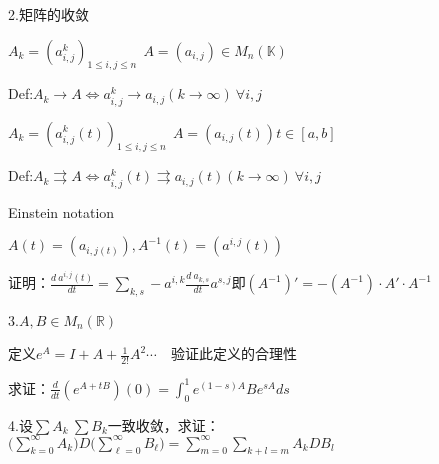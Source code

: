 \documentclass[hyperfer,UTF8,a4paper,12pt]{article}
\theoremstyle{plain}
\begin{document}
2.矩阵的收敛

$ A_k=(a_{i,j}^k)_{1\le i,j\le n}\ \ A=(a_{i,j}) \in M_n(\mathbb{K})$

 Def:$ A_k\to A\Leftrightarrow a_{i,j}^k\to a_{i,j}(k\to \infty) \ \forall i,j $

 $ A_k=(a_{i,j}^k(t))_{1\le i,j\le n}\ \ A=(a_{i,j}(t)) t\in [a,b]$

 Def:$ A_k\rightrightarrows A\Leftrightarrow a_{i,j}^k(t)\rightrightarrows a_{i,j}(t)(k\to \infty) \ \forall i,j $

Einstein notation

 $ A(t)=(a_{i,j(t)}) ,A^{-1}(t)=(a^{i,j}(t))$

 证明：$ \frac{d\ a^{i,j}(t)}{dt}=\sum\limits_{k,s}-a^{i,k}\frac{d\ a_{k,s}}{dt}a^{s,j} $即$ (A^{-1})'=-(A^{-1})\cdot A'\cdot A^{-1} $

3.$ A,B\in M_n(\mathbb{R}) $

 定义$ e^A=I+A+\frac{1}{2!}A^2\cdots\quad $验证此定义的合理性

 求证：$ \frac{d}{dt}(e^{A+tB})(0)=\int_{0}^{1}e^{(1-s)A}Be^{sA}ds $

4.设$ \sum A_k\ \sum B_k $一致收敛，求证：$ \bigg(\sum\limits_{k=0}^\infty A_k \bigg)D\bigg(\sum\limits_{\ell=0}^\infty B_\ell \bigg)=\sum\limits_{m=0}^\infty\sum\limits_{k+l=m}A_kDB_l $
\end{document}
